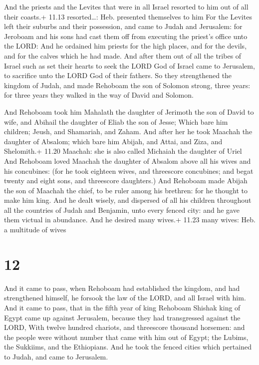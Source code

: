  And the priests and the Levites that were in all Israel
resorted to him out of all their coasts.+ 11.13 resorted\ldots: Heb.
presented themselves to him  For the Levites left their
suburbs and their possession, and came to Judah and Jerusalem: for
Jeroboam and his sons had cast them off from executing the priest's
office unto the LORD:  And he ordained him priests for the
high places, and for the devils, and for the calves which he had made.
 And after them out of all the tribes of Israel such as set
their hearts to seek the LORD God of Israel came to Jerusalem, to
sacrifice unto the LORD God of their fathers.  So they
strengthened the kingdom of Judah, and made Rehoboam the son of Solomon
strong, three years: for three years they walked in the way of David and
Solomon.

 And Rehoboam took him Mahalath the daughter of Jerimoth
the son of David to wife, and Abihail the daughter of Eliab the son of
Jesse;  Which bare him children; Jeush, and Shamariah, and
Zaham.  And after her he took Maachah the daughter of
Absalom; which bare him Abijah, and Attai, and Ziza, and Shelomith.+
11.20 Maachah: she is also called Michaiah the daughter of Uriel
 And Rehoboam loved Maachah the daughter of Absalom above
all his wives and his concubines: (for he took eighteen wives, and
threescore concubines; and begat twenty and eight sons, and threescore
daughters.)  And Rehoboam made Abijah the son of Maachah
the chief, to be ruler among his brethren: for he thought to make him
king.  And he dealt wisely, and dispersed of all his
children throughout all the countries of Judah and Benjamin, unto every
fenced city: and he gave them victual in abundance. And he desired many
wives.+ 11.23 many wives: Heb. a multitude of wives

\hypertarget{section-11}{%
\section{12}\label{section-11}}

 And it came to pass, when Rehoboam had established the
kingdom, and had strengthened himself, he forsook the law of the LORD,
and all Israel with him.  And it came to pass, that in the
fifth year of king Rehoboam Shishak king of Egypt came up against
Jerusalem, because they had transgressed against the LORD, 
With twelve hundred chariots, and threescore thousand horsemen: and the
people were without number that came with him out of Egypt; the Lubims,
the Sukkiims, and the Ethiopians.  And he took the fenced
cities which pertained to Judah, and came to Jerusalem.

